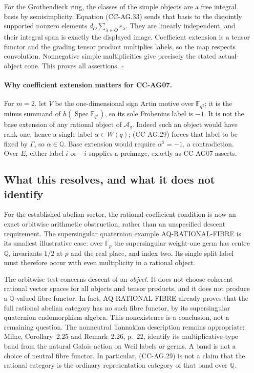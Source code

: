 For the Grothendieck ring, the classes of the simple
objects are a free integral basis by semisimplicity.
Equation (CC-AG.33) sends that basis to the disjointly
supported nonzero elements
\(d_O\sum_{\lambda\in O}e_\lambda\).  They are linearly
independent, and their integral span is exactly the
displayed image.  Coefficient extension is a tensor
functor and the grading tensor product multiplies labels,
so the map respects convolution.  Nonnegative simple
multiplicities give precisely the stated actual-object
cone.  This proves all assertions. \(\square\)

\paragraph{Why coefficient extension matters for CC-AG07.}
For \(m=2\), let \(V\) be the one-dimensional sign Artin
motive over \(\mathbb F_{q^2}\); it is the minus summand of
\(h(\operatorname{Spec}\mathbb F_{q^4})\), so its sole
Frobenius label is \(-1\).  It is not the base extension of
any rational object of \(\mathcal A_q\).  Indeed such an
object would have rank one, hence a single label
\(\alpha\in W(q)\); (CC-AG.29) forces that label to be
fixed by \(\Gamma\), so \(\alpha\in\mathbb Q\).
Base extension would require \(\alpha^2=-1\), a
contradiction.  Over \(E\), either label \(i\) or \(-i\)
supplies a preimage, exactly as CC-AG07 asserts.

\subsection{What this resolves, and what it does not identify}

For the established abelian sector, the rational coefficient
condition is now an exact orbitwise arithmetic obstruction,
rather than an unspecified descent requirement.  The
supersingular quaternion example AQ-RATIONAL-FIBRE is its
smallest illustrative case: over \(\overline{\mathbb F}_p\)
the supersingular weight-one germ has centre \(\mathbb Q\),
invariants \(1/2\) at \(p\) and the real place, and index
two.  Its single split label must therefore occur with
even multiplicity in a rational object.

The orbitwise test concerns descent of an \emph{object}.
It does not choose coherent rational vector spaces for all
objects and tensor products, and it does not produce a
\(\mathbb Q\)-valued fibre functor.  In fact,
AQ-RATIONAL-FIBRE already proves that the full rational
abelian category has no such fibre functor, by its
supersingular quaternion endomorphism algebra.  This
nonexistence is a conclusion, not a remaining question.
The nonneutral Tannakian description remains appropriate: Milne,
Corollary~2.25 and Remark~2.26, p.~22, identify its
multiplicative-type band from the natural Galois action on
Weil labels or germs.  A band is not a choice of neutral
fibre functor.  In particular, (CC-AG.29) is not a claim
that the rational category is the ordinary representation
category of that band over \(\mathbb Q\).

